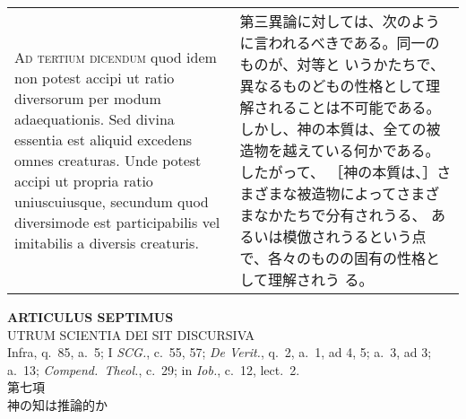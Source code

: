 \documentclass[10pt]{jsarticle} %
\begin{document}
\begin{longtable}{p{21em}p{21em}}
\\


{\scshape Ad tertium dicendum} quod idem non potest accipi ut ratio
diversorum per modum adaequationis. Sed divina essentia est aliquid
excedens omnes creaturas. Unde potest accipi ut propria ratio
uniuscuiusque, secundum quod diversimode est participabilis vel
imitabilis a diversis creaturis.

&

第三異論に対しては、次のように言われるべきである。同一のものが、対等と
いうかたちで、異なるものどもの性格として理解されることは不可能である。
しかし、神の本質は、全ての被造物を越えている何かである。したがって、
［神の本質は、］さまざまな被造物によってさまざまなかたちで分有されうる、
あるいは模倣されうるという点で、各々のものの固有の性格として理解されう
る。

\\

\end{longtable}
\newpage



\begin{center}
{\Large {\bf ARTICULUS SEPTIMUS}}\\ {\large UTRUM SCIENTIA DEI SIT
DISCURSIVA}\\ {\footnotesize Infra, q.~85, a.~5; I {\itshape SCG.},
c.~55, 57; {\itshape De Verit.}, q.~2, a.~1, ad 4, 5; a.~3, ad 3;
a.~13; {\itshape Compend.~Theol.}, c.~29; in {\itshape Iob.}, c.~12,
lect.~2.}\\ {\Large 第七項\\神の知は推論的か}
\end{center}
\end{document}

